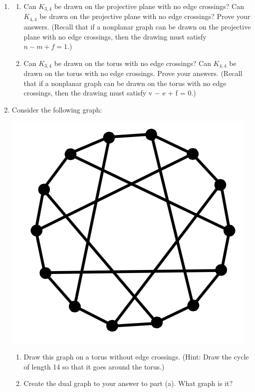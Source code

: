 \documentclass{article}
\begin{document}
\begin{enumerate}

\item 
\begin{enumerate}
	\item Can $K_{3,4}$ be drawn on the projective plane with no edge crossings? Can $K_{4,4}$ be drawn on the projective plane with no edge crossings? Prove your answers. (Recall that if a nonplanar graph can be drawn on the projective plane with no edge crossings, then the drawing must satisfy $n-m+f=1$.)

	\item Can $K_{3,4}$ be drawn on the torus with no edge crossings? Can $K_{4,4}$ be drawn on the torus with no edge crossings. Prove your answers. (Recall that if a nonplanar graph can be drawn on the torus with no edge crossings, then the drawing must satisfy v − e + f = 0.)
\end{enumerate}


\item Consider the following graph:
\begin{center}
	\includegraphics[width=.3\textwidth]{pic.png}
\end{center}
\begin{enumerate}
	\item Draw this graph on a torus without edge crossings. (Hint: Draw the cycle of length 14 so that it goes around the torus.)

	\item Create the dual graph to your answer to part (a). What graph is it?
\end{enumerate}

\end{enumerate}
\end{document}
